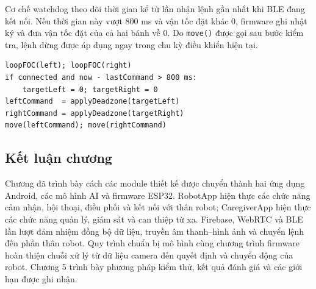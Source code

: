 Cơ chế watchdog theo dõi thời gian kể từ lần nhận lệnh gần nhất khi BLE đang kết nối. Nếu thời gian này vượt 800 ms và vận tốc đặt khác 0, firmware ghi nhật ký và đưa vận tốc đặt của cả hai bánh về 0. Do \texttt{move()} được gọi sau bước kiểm tra, lệnh dừng được áp dụng ngay trong chu kỳ điều khiển hiện tại.

\begin{lstlisting}[caption={Giả mã xử lý lệnh và điều khiển động cơ trên ESP32}]
loopFOC(left); loopFOC(right)
if connected and now - lastCommand > 800 ms:
    targetLeft = 0; targetRight = 0
leftCommand  = applyDeadzone(targetLeft)
rightCommand = applyDeadzone(targetRight)
move(leftCommand); move(rightCommand)
\end{lstlisting}

\subsection{Kết luận chương}

Chương đã trình bày cách các module thiết kế được chuyển thành hai ứng dụng Android, các mô hình AI và firmware ESP32. RobotApp hiện thực các chức năng cảm nhận, hội thoại, điều phối và kết nối với thân robot; CaregiverApp hiện thực các chức năng quản lý, giám sát và can thiệp từ xa. Firebase, WebRTC và BLE lần lượt đảm nhiệm đồng bộ dữ liệu, truyền âm thanh--hình ảnh và chuyển lệnh đến phần thân robot. Quy trình chuẩn bị mô hình cùng chương trình firmware hoàn thiện chuỗi xử lý từ dữ liệu camera đến quyết định và chuyển động của robot. Chương 5 trình bày phương pháp kiểm thử, kết quả đánh giá và các giới hạn được ghi nhận.
